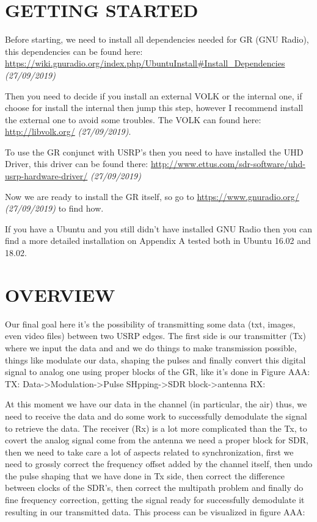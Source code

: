 \documentclass[a4paper, 10pt, conference]{ieeeconf}      %
\begin{document}
\section{GETTING STARTED}
Before starting, we need to install all dependencies needed for GR (GNU Radio), this dependencies can be found here: \url{https://wiki.gnuradio.org/index.php/UbuntuInstall#Install_Dependencies}\textit{ (27/09/2019)}

Then you need to decide if you install an external VOLK or the internal one, if choose for install the internal then jump this step, however I recommend install the external one to avoid some troubles. The VOLK can found here: \url{http://libvolk.org/} \textit{(27/09/2019)}.

To use the GR conjunct with USRP's then you need to have installed the UHD Driver, this driver can be found there: \url{http://www.ettus.com/sdr-software/uhd-usrp-hardware-driver/} \textit{(27/09/2019)}

Now we are ready to install the GR itself, so go to \url{https://www.gnuradio.org/} \textit{(27/09/2019)} to find how.

If you have a Ubuntu and you still didn't have installed GNU Radio then you can find a more detailed installation on Appendix A tested both in Ubuntu 16.02 and 18.02. 

\section{OVERVIEW}
    Our final goal here it's the possibility of transmitting some data (txt, images, even video files) between two USRP edges. The first side is our transmitter (Tx) where we input the data and and we do things to make transmission possible, things like modulate our data, shaping the pulses and finally convert this digital signal to analog one using proper blocks of the GR, like it's done in Figure AAA:     
    TX:
    Data->Modulation->Pulse SHpping->SDR block->antenna
    RX:
    
    At this moment we have our data in the channel (in particular, the air) thus, we need to receive the data and do some work to successfully demodulate the signal to retrieve the data. The receiver (Rx) is a lot more complicated than the Tx, to covert the analog signal come from the antenna we need a proper block for SDR, then we  need to take care a lot of aspects related to synchronization, first we need to grossly correct the frequency offset added by the channel itself, then undo the pulse shaping that we have done in Tx side, then correct the difference between clocks of the SDR's, then correct the multipath problem and finally do fine frequency correction, getting the signal ready for successfully demodulate it resulting in our transmitted data. This process can be visualized in figure AAA:
    
\end{document}
